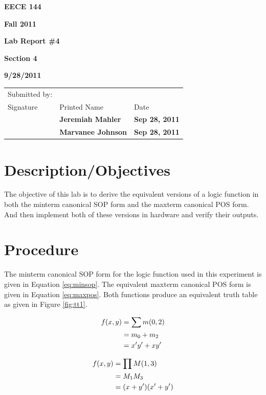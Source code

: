 \documentclass[12pt]{article}
\begin{document}

\centerline{\bf EECE 144}
\centerline{\bf Fall 2011}
\centerline{\bf}
\centerline{\bf Lab Report \#4}
\centerline{\bf Section 4}
\centerline{\bf 9/28/2011}

\begin{center}
\begin{tabularx}{\textwidth}[b]{X l l}
Submitted by: & & \\
Signature & Printed Name & Date \\
\hline
\multicolumn{1}{|X|}{} & \multicolumn{1}{|l|}{\bigstrut \bf Jeremiah Mahler} & \multicolumn{1}{|l|}{\bf Sep 28, 2011} \\
\hline
\multicolumn{1}{|X|}{} & \multicolumn{1}{|l|}{\bigstrut \bf Marvanee Johnson} & \multicolumn{1}{|l|}{\bf Sep 28, 2011} \\
\hline
\end{tabularx}
\end{center}

\section{Description/Objectives}

The objective of this lab is to derive the equivalent versions
of a logic function in both the minterm canonical SOP
form and the maxterm canonical POS form.
And then implement both of these versions in hardware and
verify their outputs.

\section{Procedure}
\label{sec:plan}

The minterm canonical SOP form for the logic function used in this
experiment is given in Equation \ref{eq:minsop}.
The equivalent maxterm canonical POS form is given in Equation \ref{eq:maxpos}.
Both functions produce an equivalent truth table as given in Figure \ref{fig:tt1}.

\begin{align}
f(x, y) &= \sum m(0, 2) \label{eq:minsop} \\
	    &= m_0 + m_2 \notag \\
		&= x' y' + x y' \notag
\end{align}

\begin{align}
f(x, y) &= \prod M(1, 3) \label{eq:maxpos} \\
	 &= M_1 M_3 \notag \\
	 &= (x + y')(x' + y') \notag
\end{align}
\end{document}
